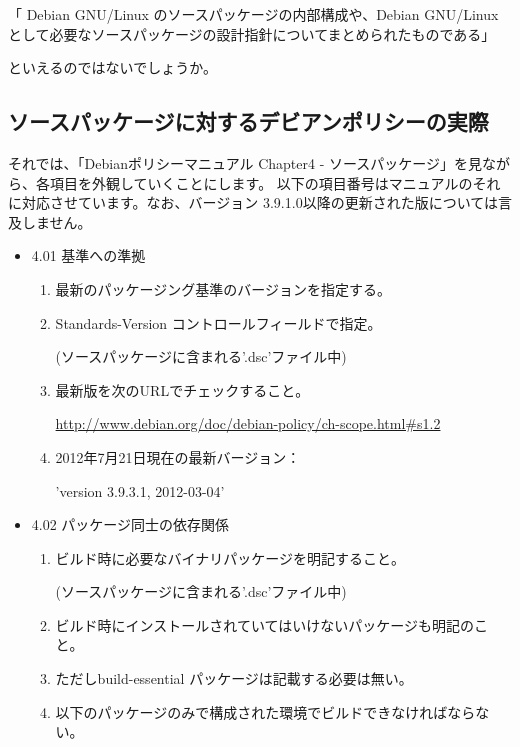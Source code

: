 \documentclass[mingoth,a4paper]{jsarticle}
\begin{document}
「 Debian GNU/Linux のソースパッケージの内部構成や、Debian GNU/Linux として必要なソースパッケージの設計指針についてまとめられたものである」

といえるのではないでしょうか。

\subsection{ソースパッケージに対するデビアンポリシーの実際}
それでは、「Debianポリシーマニュアル Chapter4 - ソースパッケージ」を見ながら、各項目を外観していくことにします。
以下の項目番号はマニュアルのそれに対応させています。なお、バージョン 3.9.1.0以降の更新された版については言及しません。


\begin{itemize}
\item 4.01 基準への準拠
  \begin{enumerate}
  \item 最新のパッケージング基準のバージョンを指定する。
  \item Standards-Version コントロールフィールドで指定。

    (ソースパッケージに含まれる'.dsc'ファイル中)
  \item 最新版を次のURLでチェックすること。

    \url{http://www.debian.org/doc/debian-policy/ch-scope.html#s1.2}
  \item 2012年7月21日現在の最新バージョン：

    'version 3.9.3.1, 2012-03-04'
  \end{enumerate}

\item 4.02 パッケージ同士の依存関係
  \begin{enumerate}
  \item ビルド時に必要なバイナリパッケージを明記すること。

    (ソースパッケージに含まれる'.dsc'ファイル中)
  \item ビルド時にインストールされていてはいけないパッケージも明記のこと。
  \item ただしbuild-essential パッケージは記載する必要は無い。
  \item 以下のパッケージのみで構成された環境でビルドできなければならない。
  \end{enumerate}


\end{itemize}
\end{document}
